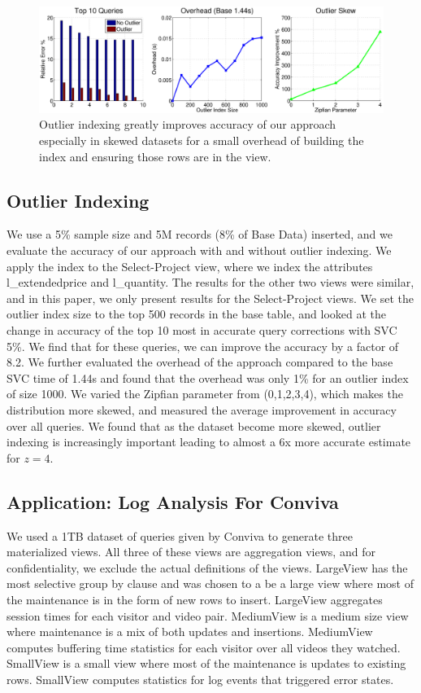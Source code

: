 \begin{figure}[ht!]
\includegraphics[trim = 45mm 0mm 45mm 0mm, clip,width=\columnwidth]{exp/exp6-outlier-full.eps}
 \caption{Outlier indexing greatly improves accuracy of our approach especially in skewed datasets for a small overhead of building the index and ensuring those rows are in the view.\label{exp7outlier}}
\end{figure}

\subsection{Outlier Indexing}
We use a 5\% sample size and 5M records (8\% of Base Data) inserted, and we evaluate the accuracy of our approach with and without outlier indexing.
We apply the index to the Select-Project view, where we index the attributes l\_extendedprice and l\_quantity.
The results for the other two views were similar, and in this paper, we only present results for the Select-Project views.
We set the outlier index size to the top 500 records in the base table, and looked at the change in accuracy of the top 10 most in accurate query corrections with SVC 5\%.
We find that for these queries, we can improve the accuracy by a factor of 8.2.
We further evaluated the overhead of the approach compared to the base SVC time of 1.44s and found that the overhead was only 1\% for an outlier index of size 1000.
We varied the Zipfian parameter from (0,1,2,3,4), which makes the distribution more skewed, and measured the average improvement in accuracy over all queries.
We found that as the dataset become more skewed, outlier indexing is increasingly important leading to almost a 6x more accurate estimate for $z=4$.

\subsection{Application: Log Analysis For Conviva}
We used a 1TB dataset of queries given by Conviva to generate three materialized views.
All three of these views are aggregation views, and for confidentiality, we exclude the actual definitions of the views.
LargeView has the most selective group by clause and was chosen to a be a large view where most of the maintenance is in the form of new rows to insert.
LargeView aggregates session times for each visitor and video pair.
MediumView is a medium size view where maintenance is a mix of both updates and insertions.
MediumView computes buffering time statistics for each visitor over all videos they watched.
SmallView is a small view where most of the maintenance is updates to existing rows.
SmallView computes statistics for log events that triggered error states.

